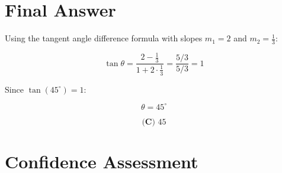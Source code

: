 \documentclass[12pt]{article}
\begin{document}
\section*{Final Answer}

Using the tangent angle difference formula with slopes $m_1 = 2$ and $m_2 = \frac{1}{3}$:

$$\tan\theta = \frac{2 - \frac{1}{3}}{1 + 2 \cdot \frac{1}{3}} = \frac{5/3}{5/3} = 1$$

Since $\tan(45^\circ) = 1$:

$$\theta = 45^\circ$$

$$\boxed{\textbf{(C) } 45}$$

\section*{Confidence Assessment}
\end{document}
